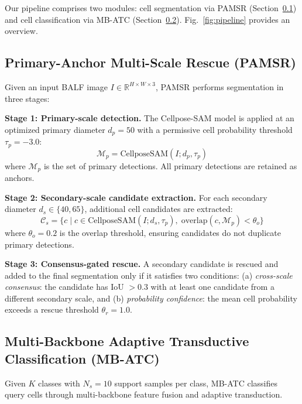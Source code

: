 \documentclass[preprint,review,12pt]{elsarticle}
\begin{document}
Our pipeline comprises two modules: cell segmentation via PAMSR (Section~\ref{sec:pamsr}) and cell classification via MB-ATC (Section~\ref{sec:mbatc}). Fig.~\ref{fig:pipeline} provides an overview.

\subsection{Primary-Anchor Multi-Scale Rescue (PAMSR)}
\label{sec:pamsr}

Given an input BALF image $I \in \mathbb{R}^{H \times W \times 3}$, PAMSR performs segmentation in three stages:

\textbf{Stage 1: Primary-scale detection.} The Cellpose-SAM model is applied at an optimized primary diameter $d_p = 50$ with a permissive cell probability threshold $\tau_p = -3.0$:
\begin{equation}
    \mathcal{M}_p = \text{CellposeSAM}(I; d_p, \tau_p)
\end{equation}
where $\mathcal{M}_p$ is the set of primary detections. All primary detections are retained as anchors.

\textbf{Stage 2: Secondary-scale candidate extraction.} For each secondary diameter $d_s \in \{40, 65\}$, additional cell candidates are extracted:
\begin{equation}
    \mathcal{C}_s = \{c \mid c \in \text{CellposeSAM}(I; d_s, \tau_p), \; \text{overlap}(c, \mathcal{M}_p) < \theta_o \}
\end{equation}
where $\theta_o = 0.2$ is the overlap threshold, ensuring candidates do not duplicate primary detections.

\textbf{Stage 3: Consensus-gated rescue.} A secondary candidate is rescued and added to the final segmentation only if it satisfies two conditions: (a) \textit{cross-scale consensus}: the candidate has IoU $> 0.3$ with at least one candidate from a different secondary scale, and (b) \textit{probability confidence}: the mean cell probability exceeds a rescue threshold $\theta_r = 1.0$.

\subsection{Multi-Backbone Adaptive Transductive Classification (MB-ATC)}
\label{sec:mbatc}

Given $K$ classes with $N_s = 10$ support samples per class, MB-ATC classifies query cells through multi-backbone feature fusion and adaptive transduction.
\end{document}
